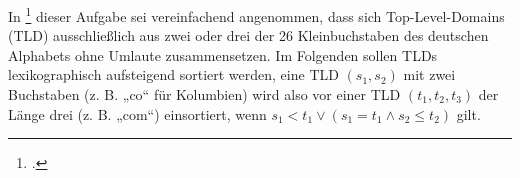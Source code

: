 \documentclass{bschlangaul-aufgabe}
\begin{document}

\let\f=\textbf
\def\u{\_}
\def\U{\textbf{\_}}

In \footcite{examen:66115:2017:03} dieser
Aufgabe sei vereinfachend angenommen, dass sich Top-Level-Domains (TLD)
ausschließlich aus zwei oder drei der 26 Kleinbuchstaben des deutschen
Alphabets ohne Umlaute zusammensetzen. Im Folgenden sollen TLDs
lexikographisch aufsteigend sortiert werden, \dh eine TLD $(s_1, s_2)$
mit zwei Buchstaben (z. B. „co“ für Kolumbien) wird also vor einer TLD
$(t_1, t_2, t_3)$ der Länge drei (z. B. „com“) einsortiert, wenn $s_1 <
t_1 \lor (s_1 = t_1 \land s_2 \leq t_2)$ gilt.
\end{document}
